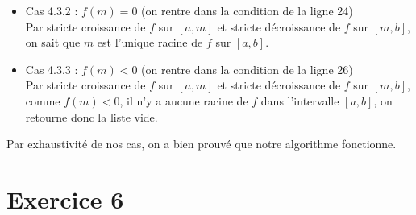 \documentclass[a4paper, 12pt]{article}
\begin{document}
\begin{itemize}
\begin{itemize}
\begin{itemize}
            \item Cas 4.3.2 : \( f(m) = 0 \) \quad (on rentre dans la condition de la ligne 24) \\
Par stricte croissance de \( f \) sur \( [a, m] \) et stricte décroissance de \( f \) sur \( [m, b] \), on sait que \( m \) est l'unique racine de \( f \) sur \( [a, b] \).
            
            \item Cas 4.3.3 : \( f(m) < 0 \) \quad (on rentre dans la condition de la ligne 26) \\
Par stricte croissance de \( f \) sur \( [a, m] \) et stricte décroissance de \( f \) sur \( [m, b] \), comme \( f(m) < 0 \), il n'y a aucune racine de \( f \) dans l'intervalle \( [a, b] \), on retourne donc la liste vide.
            
        \end{itemize}
    
    \end{itemize}

\end{itemize}
Par exhaustivité de nos cas, on a bien prouvé que notre algorithme fonctionne.

\newpage

\section{Exercice 6}
\end{document}
